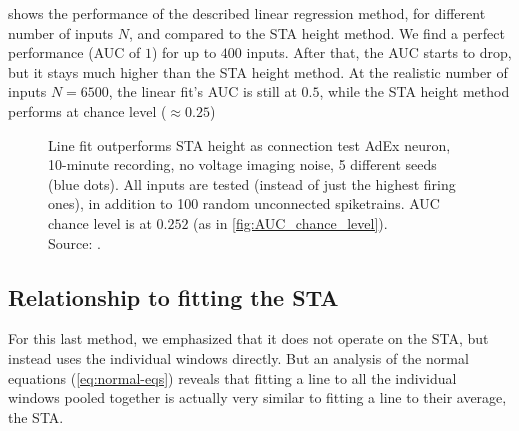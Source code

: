 
 shows the performance of the described linear regression method, for different number of inputs $N$, and compared to the STA height method. We find a perfect performance (AUC of $1$) for up to $400$ inputs. After that, the AUC starts to drop, but it stays much higher than the STA height method. At the realistic number of inputs $N = 6500$, the linear fit's AUC is still at $0.5$, while the STA height method performs at chance level ($≈ 0.25$)

\begin{figure}
    \captionn
        {Line fit outperforms STA height as connection test}
        {AdEx neuron, 10-minute recording, no voltage imaging noise,  5 different seeds (blue dots). All inputs are tested (instead of just the highest firing ones), in addition to 100 random unconnected spiketrains. AUC chance level is at $0.252$ (as in \cref{fig:AUC_chance_level}). \\
        Source: .}
    \label{fig:N_sweep__AUC__upstroke_vs_STA}
\end{figure}


\clearpage
\subsection{Relationship to fitting the STA}

For this last method, we emphasized that it does not operate on the STA, but instead uses the individual windows directly. But an analysis of the normal equations (\cref{eq:normal-eqs}) reveals that fitting a line to all the individual windows pooled together is actually very similar to fitting a line to their average, the STA.

